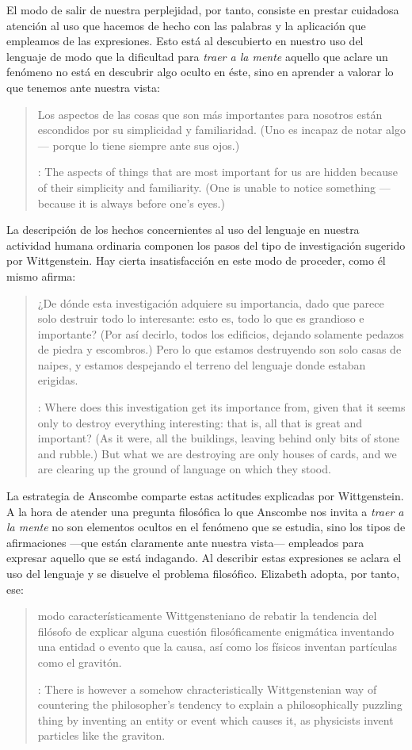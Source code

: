 El modo de salir de nuestra perplejidad, por tanto, consiste en prestar
cuidadosa atención al uso que hacemos de hecho con las palabras y la aplicación
que empleamos de las expresiones. Esto está al descubierto en nuestro uso del
lenguaje de modo que la dificultad para \emph{traer a la mente} aquello que
aclare un fenómeno no está en descubrir algo oculto en éste, sino en aprender a
valorar lo que tenemos ante nuestra vista:
\blockquote[{\cite[\S129]{wittgenstein1953phiinv}}: The aspects of things that
are most important for us are hidden because of their simplicity and
familiarity. (One is unable to notice something --- because it is always before
one's eyes.)]{Los aspectos de las cosas que son más importantes para nosotros
  están escondidos por su simplicidad y familiaridad. (Uno es incapaz de notar
  algo --- porque lo tiene siempre ante sus ojos.)}
La descripción de los hechos concernientes al uso del lenguaje en nuestra
actividad humana ordinaria componen los pasos del tipo de investigación sugerido
por Wittgenstein. Hay cierta insatisfacción en este modo de proceder, como él
mismo afirma:
\blockquote[{\cite[\S118]{wittgenstein1953phiinv}}: Where does this
investigation get its importance from, given that it seems only to destroy
everything interesting: that is, all that is great and important? (As it were,
all the buildings, leaving behind only bits of stone and rubble.) But what we
are destroying are only houses of cards, and we are clearing up the ground of
language on which they stood.]{¿De dónde esta investigación adquiere su
  importancia, dado que parece solo destruir todo lo interesante: esto es, todo
  lo que es grandioso e importante? (Por así decirlo, todos los edificios,
  dejando solamente pedazos de piedra y escombros.) Pero lo que estamos
  destruyendo son solo casas de naipes, y estamos despejando el terreno del
  lenguaje donde estaban erigidas.}

La estrategia de Anscombe comparte estas actitudes explicadas por Wittgenstein.
A la hora de atender una pregunta filosófica lo que Anscombe nos invita a
\emph{traer a la mente} no son elementos ocultos en el fenómeno que se estudia,
sino los tipos de afirmaciones ---que están claramente ante nuestra vista---
empleados para expresar aquello que se está indagando. Al describir estas
expresiones se aclara el uso del lenguaje y se disuelve el problema filosófico.
Elizabeth adopta, por tanto, ese:
\blockquote[{\cite[xix]{anscombe2011plato}}: There is however a somehow
chracteristically Wittgenstenian way of countering the philosopher's tendency to
explain a philosophically puzzling thing by inventing an entity or event which
causes it, as physicists invent particles like the graviton.]{modo
  característicamente Wittgensteniano de rebatir la tendencia del filósofo de
  explicar alguna cuestión filosóficamente enigmática inventando una entidad o
  evento que la causa, así como los físicos inventan partículas como el
  gravitón.}

